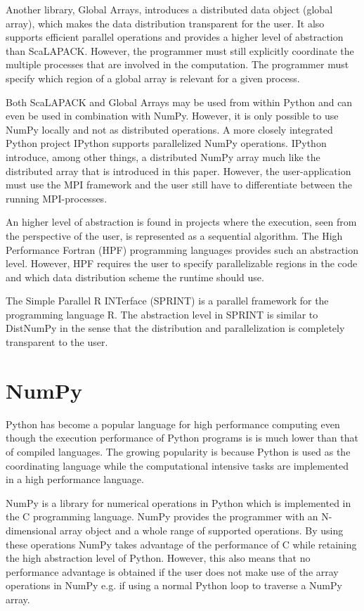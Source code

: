 \documentclass[10pt]{article}
\begin{document}
Another library, Global Arrays\cite{Nieplocha96}, introduces a distributed data object (global array), which makes the data distribution transparent for the user. It also supports efficient parallel operations and provides a higher level of abstraction than ScaLAPACK. However, the programmer must still explicitly coordinate the multiple processes that are involved in the computation. The programmer must specify which region of a global array is relevant for a given process.

Both ScaLAPACK and Global Arrays may be used from within Python and can even be used in combination with NumPy. However, it is only possible to use NumPy locally and not as distributed operations. A more closely integrated Python project IPython\cite{PER-GRA:2007} supports parallelized NumPy operations. IPython introduce, among other things, a distributed NumPy array much like the distributed array that is introduced in this paper. However, the user-application must use the MPI framework and the user still have to differentiate between the running MPI-processes.

An higher level of abstraction is found in projects where the execution, seen from the perspective of the user, is represented as a sequential algorithm. The High Performance Fortran (HPF)\cite{Loveman93} programming languages provides such an abstraction level. However, HPF requires the user to specify parallelizable regions in the code and which data distribution scheme the runtime should use. 

The Simple Parallel R INTerface (SPRINT)\cite{Hill08} is a parallel framework for the programming language R. The abstraction level in SPRINT is similar to DistNumPy in the sense that the distribution and parallelization is completely transparent to the user.

\section{NumPy}
Python has become a popular language for high performance computing even though the execution performance of Python programs is is much lower than that of compiled languages. The growing popularity is because Python is used as the coordinating language while the computational intensive tasks are implemented in a high performance language.

NumPy\cite{numpy} is a library for numerical operations in Python which is implemented in the C programming language. NumPy provides the programmer with an N-dimensional array object and a whole range of supported operations. By using these operations NumPy takes advantage of the performance of C while retaining the high abstraction level of Python. However, this also means that no performance advantage is obtained if the user does not make use of the array operations in NumPy e.g. if using a normal Python loop to traverse a NumPy array.
\end{document}
